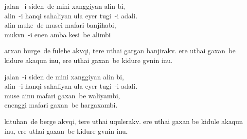 \documentclass{article}
\begin{document}
\fancyhf{}
\pagestyle{fancy}
\lhead{\thepage}%
\chead{}%
\rhead{}
\lfoot{}
\cfoot{}%
\rfoot{}

\renewcommand{\headrulewidth}{0mm}
\renewcommand{\footrulewidth}{0mm}

{\large
\noindent jalan~-i siden~de mini xanggiyan alin bi,\\
alin~-i hanqi sahaliyan ula eyer tugi~-i adali.\\
alin muke~de musei mafari banjihabi,\\
mukvn~-i enen amba kesi~be alimbi

arxan burge~de fulehe akvqi, tere uthai gargan banjirakv. ere uthai gaxan~be kidure akaqun inu, ere uthai gaxan~be kidure gvnin inu.

\noindent jalan~-i siden de mini xanggiyan alin bi,\\
alin~-i hanqi sahaliyan ula eyer tugi~-i adali.\\
muse ainu mafari gaxan~be waliyambi,\\
enenggi mafari gaxan~be hargaxambi.

kituhan~de berge akvqi, tere uthai uqulerakv. ere uthai gaxan be kidule akaqun inu, ere uthai gaxan~be kidure gvnin inu.}

\pagebreak





\end{document}
